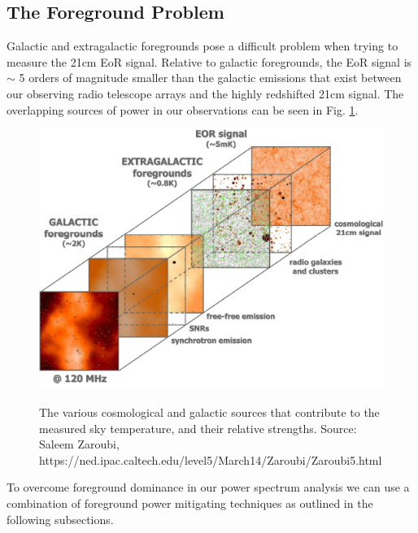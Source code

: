 \documentclass[a0,landscape]{a0poster}
\begin{document}
\begin{multicols}{4}
\color{DarkSlateGray} %
\section*{The Foreground Problem} %
Galactic and extragalactic foregrounds pose a difficult problem when trying to measure the 21cm EoR signal. Relative to galactic foregrounds, the EoR signal is $\sim$ 5 orders of magnitude smaller than the galactic emissions that exist between our observing radio telescope arrays and the highly redshifted 21cm signal. The overlapping sources of power in our observations can be seen in Fig. \ref{fig:foregroundsrcs}.


\begin{figure}[H]
\centering
\includegraphics[width=0.55\linewidth]{figures/foreground_figure.png}\\
\caption{The various cosmological and galactic sources that contribute to the measured sky temperature, and their relative strengths. Source: Saleem Zaroubi, https://ned.ipac.caltech.edu/level5/March14/Zaroubi/Zaroubi5.html}\label{fig:foregroundsrcs}
\end{figure}
To overcome foreground dominance in our power spectrum analysis we can use a combination of foreground power mitigating techniques as outlined in the following subsections.

\end{multicols}
\end{document}
